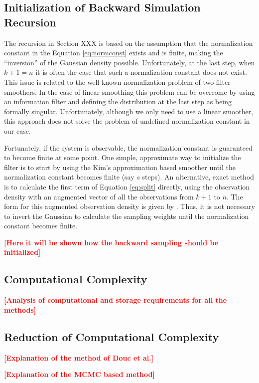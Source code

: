 \documentclass[twocolumn]{autart}    %
\newcommand{\comment}[1]{\textcolor{red}{\textbf{[#1]}}}
\begin{document}
\subsection{Initialization of Backward Simulation Recursion}
%
The recursion in Section XXX is based on the assumption that
the normalization constant in the Equation \eqref{eq:normconst} exists
and is finite, making the ``inversion'' of the Gaussian density
possible.  Unfortunately, at the last step, when $k+1 = n$ it is often
the case that such a normalization constant does not exist. This
issue is related to the well-known normalization problem of
two-filter smoothers. In the case of linear smoothing this
problem can be overcome by using an information filter and defining
the distribution at the last step as being formally singular.
Unfortunately, although we only need to use a linear smoother, this
approach does not solve the problem of undefined normalization
constant in our case.

Fortunately, if the system is observable, the normalization constant
is guaranteed to become finite at some point. One simple, approximate
way to initialize the filter is to start by using the Kim's approximation
based smoother until the normalization constant becomes finite (say
$s$ steps). An alternative, exact method is to calculate
the first term of Equation \eqref{eq:split} directly, using the
observation density with an augmented vector of all the observations
from $k+1$ to $n$. The form for this augmented observation density is
given by \cite{Kitagawa:1994}. Thus, it is not necessary to invert
the Gaussian to calculate the sampling weights until the normalization
constant becomes finite.

\comment{Here it will be shown how the backward sampling should
 be initialized}


\subsection{Computational Complexity}

\comment{Analysis of computational and storage requirements for all
  the methods}


\subsection{Reduction of Computational Complexity}

\comment{Explanation of the method of Douc et al.}

\comment{Explanation of the MCMC based method}
\end{document}
